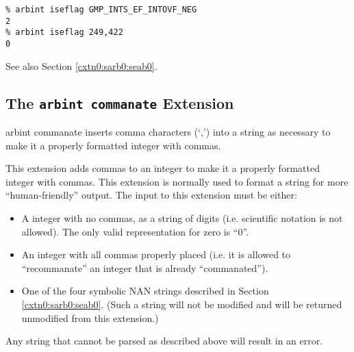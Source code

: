 \begin{tclcommandsampleinvocations}
\begin{scriptsize}
\begin{verbatim}
% arbint iseflag GMP_INTS_EF_INTOVF_NEG
2
% arbint iseflag 249,422
0
\end{verbatim}
\end{scriptsize}
\end{tclcommandsampleinvocations}

\begin{tclcommandseealso}
See also Section \ref{cxtn0:sarb0:seab0}.
\end{tclcommandseealso}


\subsection{The \texttt{arbint commanate} Extension}
\label{cxtn0:sarb0:scom0}

\begin{tclcommandname}{arbint commanate}%
inserts comma characters (`,') into a string as necessary to
make it a properly formatted integer with commas.
\end{tclcommandname}

\begin{tclcommandsynopsis}
\end{tclcommandsynopsis}

\begin{tclcommanddescription}
This extension adds commas to an integer to make it a properly
formatted integer with commas.  This extension is normally used to
format a string for more ``human-friendly'' output.  The input to this extension
must be either:

\begin{itemize}
\item A integer with no commas, as a string of digits (i.e. 
      scientific notation is not allowed).  The only valid representation
	  for zero is ``0''.
\item An integer with all commas properly placed (i.e. it is 
      allowed to ``recommanate'' an integer that is already
	  ``commanated'').
\item One of the four symbolic NAN strings described in
      Section \ref{cxtn0:sarb0:seab0}.  (Such a string
	  will not be modified and will be returned unmodified from
	  this extension.)
\end{itemize}

Any string that cannot be parsed as described above will result in
an error.
\end{tclcommanddescription}

